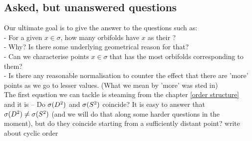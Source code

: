 \subsection{Asked, but unanswered questions}
Our ultimate goal is to give the answer to the questions such as: \\
- For a given $x \in \sigma$, how many orbifolds have $x$ as their \Eoc?\\
- Why? Is there some underlying geometrical reason for that?\\
- Can we characterise points $x \in \sigma$ that has the most orbifolds corresponding to them? \\
- Is there any reasonable normalisation to counter the effect that there are 'more' 
points as we go 
to lesser values. (What we mean by 'more' was sted in) \\
The first equstion we can tackle is steaming from the chapter \ref{order structure} 
and it is -- Do ${{\sigma}(D^2)}$ and ${{\sigma}(S^2)}$ coincide? It is easy to answer that ${{\sigma}(D^2)} \neq {{\sigma}(S^2)}$ 
(and we will do that along some harder questions in the moment), but do they coincide 
starting from a sufficiently distant point? 
write about cyclic order

